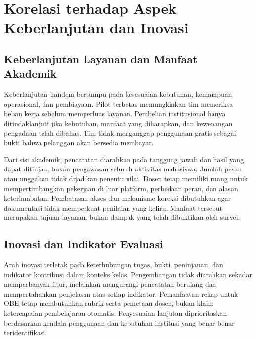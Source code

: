 \documentclass[12pt,a4paper,oneside]{report}
\begin{document}
\section{Korelasi terhadap Aspek Keberlanjutan dan Inovasi}
\subsection{Keberlanjutan Layanan dan Manfaat Akademik}
Keberlanjutan Tandem bertumpu pada kesesuaian kebutuhan, kemampuan operasional, dan pembiayaan. Pilot terbatas memungkinkan tim memeriksa beban kerja sebelum memperluas layanan. Pembelian institusional hanya ditindaklanjuti jika kebutuhan, manfaat yang diharapkan, dan kewenangan pengadaan telah dibahas. Tim tidak menganggap penggunaan gratis sebagai bukti bahwa pelanggan akan bersedia membayar.

Dari sisi akademik, pencatatan diarahkan pada tanggung jawab dan hasil yang dapat ditinjau, bukan pengawasan seluruh aktivitas mahasiswa. Jumlah pesan atau unggahan tidak dijadikan penentu nilai. Dosen tetap memiliki ruang untuk mempertimbangkan pekerjaan di luar platform, perbedaan peran, dan alasan keterlambatan. Pembatasan akses dan mekanisme koreksi dibutuhkan agar dokumentasi tidak memperkuat penilaian yang keliru. Manfaat tersebut merupakan tujuan layanan, bukan dampak yang telah dibuktikan oleh survei.

\subsection{Inovasi dan Indikator Evaluasi}
Arah inovasi terletak pada keterhubungan tugas, bukti, peninjauan, dan indikator kontribusi dalam konteks kelas. Pengembangan tidak diarahkan sekadar memperbanyak fitur, melainkan mengurangi pencatatan berulang dan mempertahankan penjelasan atas setiap indikator. Pemanfaatan rekap untuk OBE tetap membutuhkan rubrik serta pemetaan dosen, bukan klaim ketercapaian pembelajaran otomatis. Penyesuaian lanjutan diprioritaskan berdasarkan kendala penggunaan dan kebutuhan institusi yang benar-benar teridentifikasi.
\end{document}
